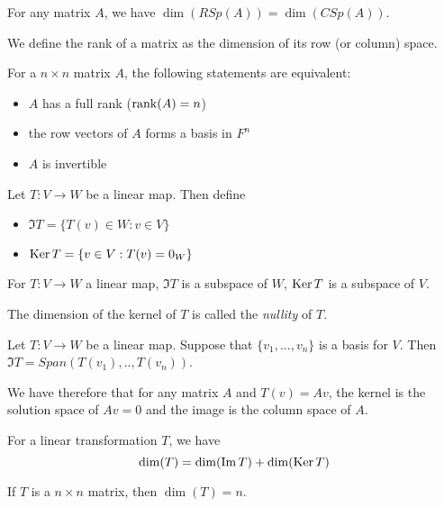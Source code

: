 \documentclass[11pt]{article}
\begin{document}
\begin{theorem}
  For any matrix \(A\), we have \(\dim(RSp(A))=\dim(CSp(A))\).
\end{theorem}

\begin{definition}[Rank]
  We define the rank of a matrix as the dimension of its row (or column) space.
\end{definition}

\begin{proposition}
  For a \(n\times n\) matrix \(A\), the following statements are equivalent: 
  \begin{itemize}
    \item \(A\) has a full rank (\(\rank(A)=n\))
    \item the row vectors of \(A\) forms a basis in \(F^n\)
    \item \(A\) is invertible
  \end{itemize}
\end{proposition}

\begin{definition}
  Let \(T:V\to W\) be a linear map. Then define
  \begin{itemize}
    \item \(\Im T=\{T(v)\in W:v\in V\}\)
    \item \(\rm{Ker}\,T=\{v\in V: T(v)=0_W\}\)
  \end{itemize}
\end{definition}

\begin{proposition}
  For \(T:V\to W\) a linear map, \(\Im T\) is a subspace of \(W\), \(\rm{Ker}\,T\) is a subspace of \(V\).
\end{proposition}

The dimension of the kernel of \(T\) is called the \emph{nullity} of \(T\).

\begin{proposition}
  Let \(T:V\to W\) be a linear map. Suppose that \(\{v_1, ..., v_n\}\) is a basis for \(V\). Then \(\Im T = Span({T(v_1), .., T(v_n)})\).
\end{proposition}

\begin{remark}
  We have therefore that for any matrix \(A\) and \(T(v)=Av\), the kernel is the solution space of \(Av=0\) and the image is the column space of \(A\).
\end{remark}

\begin{theorem}
  For a linear transformation \(T\), we have
  \[\dim(T)=\dim(\Im T)+\dim(\rm{Ker}\, T)\]
\end{theorem}
If \(T\) is a \(n\times n\) matrix, then \(\dim(T)=n\).%
\end{document}
